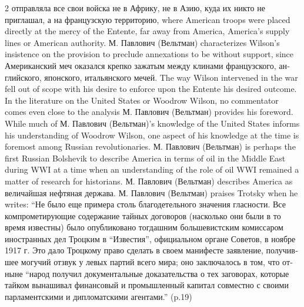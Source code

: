 \documentclass[10pt,a4paper,twoside]{article} %
\begin{document}
\begin{multicols}{2}
{отправляла все свои войска не в Африку, не в Азию, куда их никто не приглашал, а на французскую территорию}, where American troops were placed directly at the mercy of the Entente, far away from America, America’s supply lines or American authority. \textrussian{М. Павлович (Вельтман)} characterizes Wilson’s insistence on the provision to preclude annexations   to be without support, since \textrussian{Американский меч оказался крепко зажатым между клинами французского, английского, японского, итальянского мечей}. The way Wilson intervened in the war fell out of scope with his desire to enforce upon the Entente his desired outcome. \newline \indent In the literature on the United States or Woodrow Wilson, no commentator comes even close to the analysis \textrussian{М. Павлович (Вельтман)} provides his foreword. While much of \textrussian{М. Павлович (Вельтман)}’s knowledge of the United States informs his understanding of Woodrow Wilson, one aspect of his knowledge at the time is foremost among Russian revolutionaries. \textrussian{М. Павлович (Вельтман)} is perhaps the first Russian Bolshevik to describe America in terms of oil in the Middle East during WWI at a time when an understanding of the role of oil WWI remained a matter of research for historians.  \textrussian{М. Павлович (Вельтман)} describes America as \textrussian{величайшая нефтяная держава}. \newline \indent \textrussian{М. Павлович (Вельтман)} praises Trotsky when he writes: “\textrussian{Не было  еще примера столь благодетельного значения гласности. Все компрометирующие содержание тайных договоров (насколько они были в то время известны) было опубликовано тогдашним большевистским комиссаром иностранных дел Троцким в “Известия”, официальном органе Советов, в ноябре 1917 г. Это дало Троцкому право сделать в своем манифесте заявление, получившее могучий отзвук у левых партий всего мира; оно заключалось в том, что отныне “народ получил документальные доказательства о тех заговорах, которые тайком вынашивал финансовый и промышленный капитал совместно с своими парламентскими и дипломатскими агентами}.” (p.19)  


\end{multicols}
\end{document}
